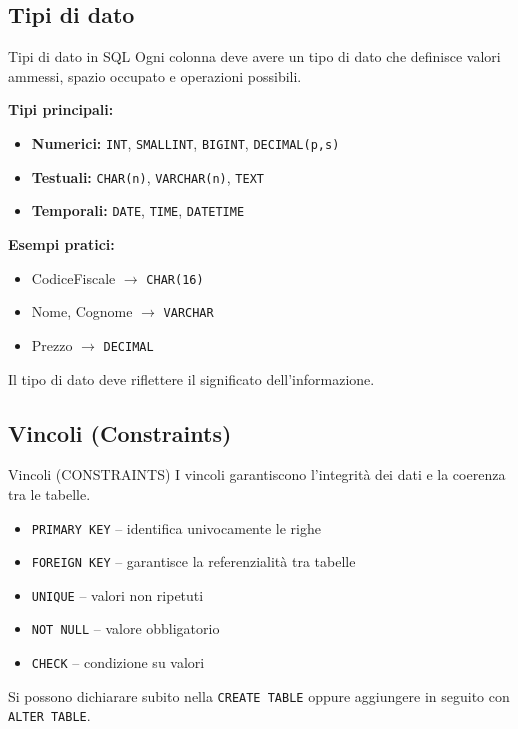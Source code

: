 \documentclass{beamer}
\begin{document}
\subsection{Tipi di dato}
\begin{frame}{Tipi di dato in SQL}
Ogni colonna deve avere un tipo di dato che definisce valori ammessi, spazio occupato e operazioni possibili.

\medskip
\textbf{Tipi principali:}
\begin{itemize}
    \item \textbf{Numerici:} \texttt{INT}, \texttt{SMALLINT}, \texttt{BIGINT}, \texttt{DECIMAL(p,s)}
    \item \textbf{Testuali:} \texttt{CHAR(n)}, \texttt{VARCHAR(n)}, \texttt{TEXT}
    \item \textbf{Temporali:} \texttt{DATE}, \texttt{TIME}, \texttt{DATETIME}
\end{itemize}

\medskip
\textbf{Esempi pratici:}
\begin{itemize}
    \item CodiceFiscale $\rightarrow$ \texttt{CHAR(16)}
    \item Nome, Cognome $\rightarrow$ \texttt{VARCHAR}
    \item Prezzo $\rightarrow$ \texttt{DECIMAL}
\end{itemize}

\medskip
\alert{Il tipo di dato deve riflettere il significato dell’informazione.}
\end{frame}
\subsection{Vincoli (Constraints)}

\begin{frame}[fragile]{Vincoli (CONSTRAINTS)}
I vincoli garantiscono l’integrità dei dati e la coerenza tra le tabelle.

\begin{itemize}
    \item \texttt{PRIMARY KEY} -- identifica univocamente le righe
    \item \texttt{FOREIGN KEY} -- garantisce la referenzialità tra tabelle
    \item \texttt{UNIQUE} -- valori non ripetuti
    \item \texttt{NOT NULL} -- valore obbligatorio
    \item \texttt{CHECK} -- condizione su valori
\end{itemize}

\medskip
\alert{Si possono dichiarare subito nella \texttt{CREATE TABLE} oppure aggiungere in seguito con \texttt{ALTER TABLE}.}
\end{frame}
\end{document}
